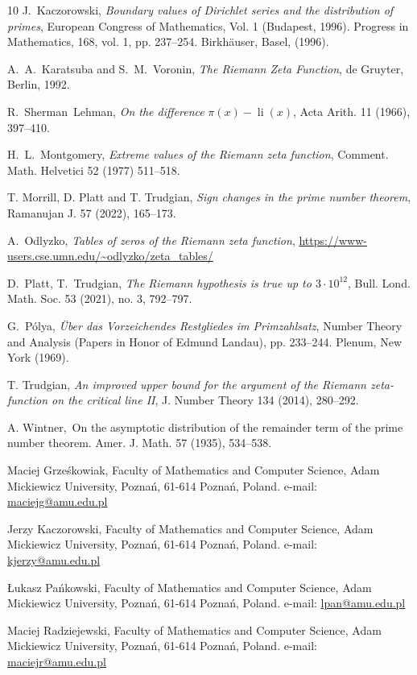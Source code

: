 \documentclass[oneside,english]{amsart}
\numberwithin{equation}{section}
\numberwithin{figure}{section}
\theoremstyle{plain}
\theoremstyle{plain}
\theoremstyle{plain}
\theoremstyle{definition}
\begin{document}
\begin{thebibliography}{10}
J.~Kaczorowski, \emph{Boundary values of
Dirichlet series and the distribution of primes}, European Congress
of Mathematics, Vol. 1 (Budapest, 1996). Progress in Mathematics,
168, vol. 1, pp. 237--254. Birkhäuser, Basel, (1996).

A.~A.~Karatsuba and S.~M.~Voronin, \emph{The
Riemann Zeta Function}, de Gruyter, Berlin, 1992.

R.~Sherman~Lehman, \emph{On the difference
}$\pi(x)-\operatorname{li}(x)$, Acta Arith. 11 (1966), 397--410.

H.~L.~Montgomery, \emph{Extreme values
of the Riemann zeta function}, Comment. Math. Helvetici 52 (1977)
511--518.

T. Morrill, D. Platt and T. Trudgian,
\emph{Sign changes in the prime number theorem}, Ramanujan J. 57 (2022),
165--173.

A.~Odlyzko, \emph{Tables of zeros of the Riemann
zeta function}, \url{https://www-users.cse.umn.edu/~odlyzko/zeta_tables/}

D.~Platt, T.~Trudgian, \emph{The Riemann
hypothesis is true up to $3\cdot10^{12}$}, Bull. Lond. Math. Soc.
53 (2021), no. 3, 792--797.

G.~P\'{o}lya, \emph{\"{U}ber das Vorzeichendes
Restgliedes im Primzahlsatz}, Number Theory and Analysis (Papers in
Honor of Edmund Landau), pp. 233--244. Plenum, New York (1969).

T. Trudgian, \emph{An improved upper bound
for the argument of the Riemann zeta-function on the critical line
II}, J. Number Theory 134 (2014), 280--292.

A. Wintner, On the asymptotic distribution of
the remainder term of the prime number theorem. Amer. J. Math. 57
(1935), 534--538.

\end{thebibliography}

\bigskip
\bigskip
\noindent
Maciej Grześkowiak, Faculty of Mathematics and Computer Science, Adam Mickiewicz University, Pozna\'n, 61-614 Pozna\'n, Poland. e-mail: \url{maciejg@amu.edu.pl}

\medskip
\noindent
Jerzy Kaczorowski, Faculty of Mathematics and Computer Science, Adam Mickiewicz University, Pozna\'n, 61-614 Pozna\'n, Poland. e-mail: \url{kjerzy@amu.edu.pl}

\medskip
\noindent
Łukasz Pańkowski, Faculty of Mathematics and Computer Science, Adam Mickiewicz University, Pozna\'n, 61-614 Pozna\'n, Poland. e-mail: \url{lpan@amu.edu.pl}

\medskip
\noindent
Maciej Radziejewski, Faculty of Mathematics and Computer Science, Adam Mickiewicz University, Pozna\'n, 61-614 Pozna\'n, Poland. e-mail: \url{maciejr@amu.edu.pl}
\end{document}
